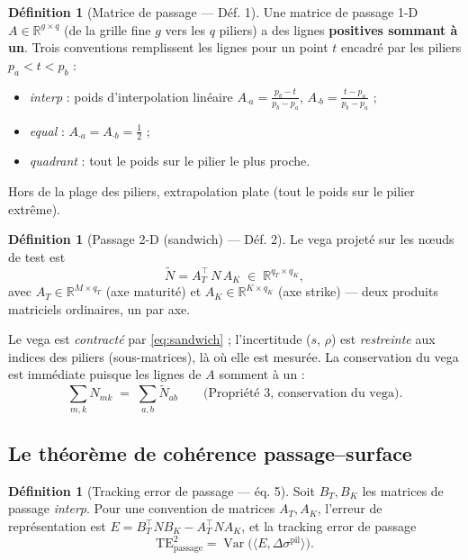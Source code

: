 \documentclass[11pt,a4paper]{article}
\DeclareMathOperator{\Var}{Var}
\newcommand{\R}{\mathbb{R}}
\newcommand{\dsig}{\Delta\sigma}
\newcommand{\Nt}{\tilde{N}}
\theoremstyle{plain}
\theoremstyle{definition}
\newtheorem{definition}[theoreme]{Définition}
\theoremstyle{remark}
\begin{document}
\begin{definition}[Matrice de passage --- Déf. 1]\label{def:passage}
Une matrice de passage 1-D $A \in \R^{g\times q}$ (de la grille fine $g$ vers les $q$
piliers) a des lignes \textbf{positives sommant à un}. Trois conventions remplissent
les lignes pour un point $t$ encadré par les piliers $p_a < t < p_b$ :
\begin{itemize}[nosep]
\item \emph{interp} : poids d'interpolation linéaire $A_{\cdot a}=\frac{p_b-t}{p_b-p_a}$,
      $A_{\cdot b}=\frac{t-p_a}{p_b-p_a}$ ;
\item \emph{equal} : $A_{\cdot a}=A_{\cdot b}=\tfrac12$ ;
\item \emph{quadrant} : tout le poids sur le pilier le plus proche.
\end{itemize}
Hors de la plage des piliers, extrapolation plate (tout le poids sur le pilier extrême).
\end{definition}

\begin{definition}[Passage 2-D (sandwich) --- Déf. 2]
Le vega projeté sur les nœuds de test est
\begin{equation}
\Nt = A_T^\top\, N\, A_K \;\in\; \R^{q_T\times q_K},
\label{eq:sandwich}
\end{equation}
avec $A_T\in\R^{M\times q_T}$ (axe maturité) et $A_K\in\R^{K\times q_K}$ (axe strike) ---
deux produits matriciels ordinaires, un par axe.
\end{definition}

\noindent Le vega est \emph{contracté} par \eqref{eq:sandwich} ; l'incertitude
($s$, $\rho$) est \emph{restreinte} aux indices des piliers (sous-matrices), là où elle
est mesurée. La conservation du vega est immédiate puisque les lignes de $A$ somment à
un :
\begin{equation}
\textstyle\sum_{m,k} N_{mk} \;=\; \sum_{a,b}\Nt_{ab}
\qquad\text{(Propriété 3, conservation du vega).}
\label{eq:conservation}
\end{equation}

\subsection{Le théorème de cohérence passage--surface}

\begin{definition}[Tracking error de passage --- éq. 5]
Soit $B_T,B_K$ les matrices de passage \emph{interp}. Pour une convention de matrices
$A_T,A_K$, l'erreur de représentation est $E = B_T^\top N B_K - A_T^\top N A_K$, et la
tracking error de passage
\begin{equation}
\mathrm{TE}^2_{\mathrm{passage}} = \Var\big(\langle E, \dsig^{\mathrm{pil}}\rangle\big).
\label{eq:te-passage}
\end{equation}
\end{definition}
\end{document}
